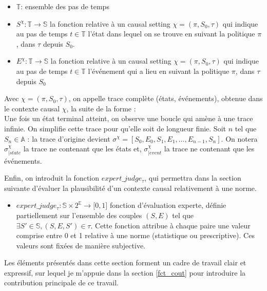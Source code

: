 \begin{itemize}
    \item $\mathds{T}$: ensemble des pas de temps
    
    \item $S^\chi: \mathds{T}\to \mathds{S}$ la fonction relative à un causal setting $\chi = (\pi,S_0,\tau)$ qui indique au pas de temps $t\in \mathds{T}$ l'état dans lequel on se trouve en suivant la politique $\pi$, dans $\tau$ depuis $S_0$.

    \item $E^\chi: \mathds{T}\to \mathds{S}$ la fonction relative à un causal setting $\chi = (\pi,S_0,\tau)$ qui indique au pas de temps $t\in \mathds{T}$ l'événement qui a lieu en suivant la politique $\pi$, dans $\tau$ depuis $S_0$
\end{itemize}

\begin{definition}[Trace]
    Avec $\chi = (\pi,S_0,\tau)$, on appelle trace complète (états, événements), obtenue dans le contexte causal $\chi$, la suite de la forme :
    \begin{equation*}
        [S_0,E_0,S_1,E_1,\dots,E_{n-1},S_n,E_n,S_n,E_n\dots]
    \end{equation*}
    Une fois un état terminal atteint, on observe une boucle qui amène à une trace infinie. On simplifie cette trace pour qu'elle soit de longueur finie. Soit $n$ tel que $S_n\in \mathds{A}$ : la trace d'origine devient $\sigma^\chi=[S_0,E_0,S_1,E_1,\dots,E_{n-1},S_n]$. On notera $\sigma^{\chi}_{|state}$ la trace ne contenant que les états et, $\sigma^{\chi}_{|event}$ la trace ne contenant que les événements.
\end{definition}


Enfin, on introduit la fonction $expert\_judge_\tau$, qui permettra dans la section suivante d'évaluer la plausibilité d'un contexte causal relativement à une norme.
\begin{itemize}
    \item $expert\_judge_\tau: \mathds{S} \times 2 ^{\mathds{E}}\to \lbrack 0, 1\rbrack$ fonction d'évaluation experte, définie partiellement sur l'ensemble des couples $(S,E)$ tel que $\exists S'\in\mathds{S},(S,E,S')\in \tau$. Cette fonction attribue à chaque paire une valeur comprise entre 0 et 1 relative à une norme (statistique ou prescriptive). Ces valeurs sont fixées de manière subjective.
\end{itemize}

Les éléments présentés dans cette section forment un cadre de travail clair et expressif, sur lequel je m'appuie dans la section \ref{fct_cout} pour introduire la contribution principale de ce travail.